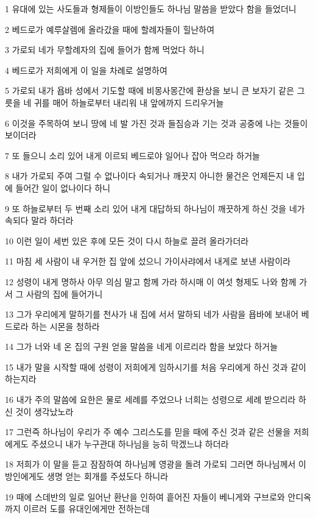 \par 1 유대에 있는 사도들과 형제들이 이방인들도 하나님 말씀을 받았다 함을 들었더니
\par 2 베드로가 예루살렘에 올라갔을 때에 할례자들이 힐난하여
\par 3 가로되 네가 무할례자의 집에 들어가 함께 먹었다 하니
\par 4 베드로가 저희에게 이 일을 차례로 설명하여
\par 5 가로되 내가 욥바 성에서 기도할 때에 비몽사몽간에 환상을 보니 큰 보자기 같은 그릇을 네 귀를 매어 하늘로부터 내리워 내 앞에까지 드리우거늘
\par 6 이것을 주목하여 보니 땅에 네 발 가진 것과 들짐승과 기는 것과 공중에 나는 것들이 보이더라
\par 7 또 들으니 소리 있어 내게 이르되 베드로야 일어나 잡아 먹으라 하거늘
\par 8 내가 가로되 주여 그럴 수 없나이다 속되거나 깨끗지 아니한 물건은 언제든지 내 입에 들어간 일이 없나이다 하니
\par 9 또 하늘로부터 두 번째 소리 있어 내게 대답하되 하나님이 깨끗하게 하신 것을 네가 속되다 말라 하더라
\par 10 이런 일이 세번 있은 후에 모든 것이 다시 하늘로 끌려 올라가더라
\par 11 마침 세 사람이 내 우거한 집 앞에 섰으니 가이사랴에서 내게로 보낸 사람이라
\par 12 성령이 내게 명하사 아무 의심 말고 함께 가라 하시매 이 여섯 형제도 나와 함께 가서 그 사람의 집에 들어가니
\par 13 그가 우리에게 말하기를 천사가 내 집에 서서 말하되 네가 사람을 욥바에 보내어 베드로라 하는 시몬을 청하라
\par 14 그가 너와 네 온 집의 구원 얻을 말씀을 네게 이르리라 함을 보았다 하거늘
\par 15 내가 말을 시작할 때에 성령이 저희에게 임하시기를 처음 우리에게 하신 것과 같이 하는지라
\par 16 내가 주의 말씀에 요한은 물로 세례를 주었으나 너희는 성령으로 세례 받으리라 하신 것이 생각났노라
\par 17 그런즉 하나님이 우리가 주 예수 그리스도를 믿을 때에 주신 것과 같은 선물을 저희에게도 주셨으니 내가 누구관대 하나님을 능히 막겠느냐 하더라
\par 18 저희가 이 말을 듣고 잠잠하여 하나님께 영광을 돌려 가로되 그러면 하나님께서 이방인에게도 생명 얻는 회개를 주셨도다 하니라
\par 19 때에 스데반의 일로 일어난 환난을 인하여 흩어진 자들이 베니게와 구브로와 안디옥까지 이르러 도를 유대인에게만 전하는데
